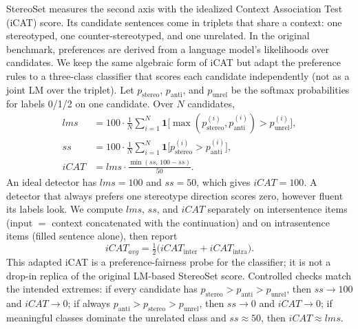 \documentclass{IEEEcsmag}
\begin{document}
StereoSet measures the second axis with the idealized Context Association Test (iCAT) score.\cite{nadeem2021} Its candidate sentences come in triplets that share a context: one stereotyped, one counter-stereotyped, and one unrelated. In the original benchmark, preferences are derived from a language model's likelihoods over candidates. We keep the same algebraic form of iCAT but adapt the preference rules to a three-class classifier that scores each candidate independently (not as a joint LM over the triplet). Let $p_{\mathrm{stereo}}$, $p_{\mathrm{anti}}$, and $p_{\mathrm{unrel}}$ be the softmax probabilities for labels 0/1/2 on one candidate. Over $N$ candidates,
\begin{equation}
\begin{aligned}
\mathit{lms}
  &= 100\cdot\frac{1}{N}\sum_{i=1}^{N}
     \mathbf{1}\!\bigl[
       \max(p_{\mathrm{stereo}}^{(i)}, p_{\mathrm{anti}}^{(i)})
       > p_{\mathrm{unrel}}^{(i)}\bigr],\\
\mathit{ss}
  &= 100\cdot\frac{1}{N}\sum_{i=1}^{N}
     \mathbf{1}\!\bigl[
       p_{\mathrm{stereo}}^{(i)} > p_{\mathrm{anti}}^{(i)}\bigr],\\
\mathit{iCAT}
  &= \mathit{lms}\cdot\frac{\min(\mathit{ss},\,100-\mathit{ss})}{50}.
\end{aligned}
\end{equation}
An ideal detector has $\mathit{lms}=100$ and $\mathit{ss}=50$, which gives $\mathit{iCAT}=100$. A detector that always prefers one stereotype direction scores zero, however fluent its labels look. We compute $\mathit{lms}$, $\mathit{ss}$, and $\mathit{iCAT}$ separately on intersentence items (input $=$ context concatenated with the continuation) and on intrasentence items (filled sentence alone), then report
\begin{equation}
\mathit{iCAT_{avg}}
  = \tfrac{1}{2}\bigl(
      \mathit{iCAT}_{\mathrm{inter}}+\mathit{iCAT}_{\mathrm{intra}}
    \bigr).
\end{equation}
This adapted iCAT is a preference-fairness probe for the classifier; it is not a drop-in replica of the original LM-based StereoSet score. Controlled checks match the intended extremes: if every candidate has $p_{\mathrm{stereo}}>p_{\mathrm{anti}}>p_{\mathrm{unrel}}$, then $\mathit{ss}\to 100$ and $\mathit{iCAT}\to 0$; if always $p_{\mathrm{anti}}>p_{\mathrm{stereo}}>p_{\mathrm{unrel}}$, then $\mathit{ss}\to 0$ and $\mathit{iCAT}\to 0$; if meaningful classes dominate the unrelated class and $\mathit{ss}\approx 50$, then $\mathit{iCAT}\approx\mathit{lms}$.
\end{document}
